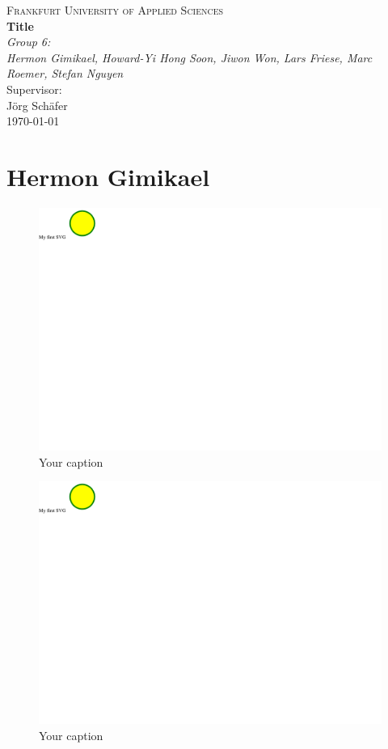 \documentclass{article}
\begin{document}
\begin{titlepage}
    \centering
    \vspace*{0cm}
    {\scshape\Large Frankfurt University of Applied Sciences}\\[2.5cm]
    {\huge\bfseries Title}\\[5cm]
    {\Large\itshape Group 6:}\\
    {\Large\itshape Hermon Gimikael, Howard-Yi Hong Soon, Jiwon Won, Lars Friese, Marc Roemer, Stefan Nguyen}\\[4cm]
    Supervisor:\\
    Jörg Schäfer\\[3cm]
    {\large \today}
\end{titlepage}

\tableofcontents
\newpage

\section{Hermon Gimikael}
\begin{figure}[h!]
    \centering
    \captionsetup{labelformat=empty}
    \caption{Your caption}
    \includegraphics[width=\textwidth, angle=0]{Kreis2.pdf}
\end{figure}
\newpage
\begin{figure}[h!]
    \centering
    \captionsetup{labelformat=empty}
    \caption{Your caption}
    \includegraphics[width=\textwidth, angle=0]{Kreis2.pdf}
\end{figure}
\newpage
\end{document}
